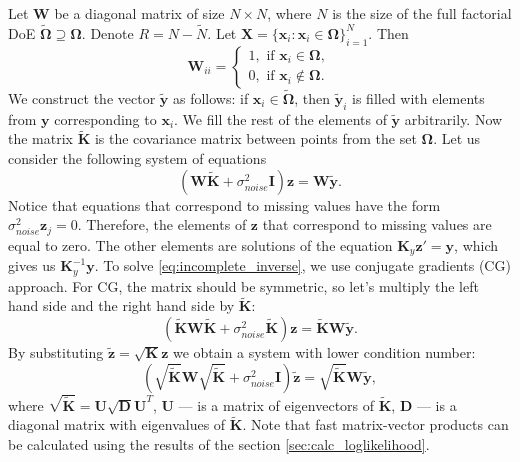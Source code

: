 Let $\mathbf{W}$ be a diagonal matrix of size $N \times N$,
where $N$ is the size of the full factorial DoE
$\boldsymbol{\widetilde{\Omega}} \supseteq \boldsymbol{\Omega}$.
Denote $R = N - \widetilde{N}$.
Let
$\mathbf{X} =
\{\mathbf{x}_i: \mathbf{x}_i \in \boldsymbol{\Omega}\}_{i = 1}^{N}$.
Then
\begin{equation*}
\mathbf{W}_{ii} =
\begin{cases}
    1, \mbox{ if } \mathbf{x}_i \in \boldsymbol{\Omega}, \\
    0, \mbox{ if } \mathbf{x}_i \notin \boldsymbol{\Omega}.
\end{cases}
\end{equation*}
We construct the vector $\mathbf{\widetilde{y}}$ as follows:
if $\mathbf{x}_i \in \boldsymbol{\widetilde{\Omega}}$,
then $\mathbf{\widetilde{y}}_i$ is filled with elements from $\mathbf{y}$
corresponding to $\mathbf{x}_i$.
We fill the rest of the elements of $\mathbf{\widetilde{y}}$ arbitrarily.
Now the matrix $\mathbf{\widetilde{K}}$ is the covariance matrix between points from
the set $\boldsymbol{\Omega}$.
Let us consider the following system of equations
\begin{equation}
\label{eq:incomplete_inverse}
\left (\mathbf{W \widetilde{K}} + \sigma^2_{noise}\mathbf{I} \right )\mathbf{z} =
\mathbf{W\widetilde{y}}.
\end{equation}
Notice that equations that correspond to missing values
have the form $\sigma_{noise}^2 \mathbf{z}_j = 0$.
Therefore, the elements of $\mathbf{z}$ that correspond to missing values are equal to zero.
The other elements are solutions of the equation $\mathbf{K}_y \mathbf{z}' = \mathbf{y}$,
which gives us $\mathbf{K}_y^{-1}\mathbf{y}$.
To solve \eqref{eq:incomplete_inverse}, we use conjugate gradients (CG) approach.
For CG, the matrix should be symmetric, so let's multiply the left hand side and the right hand
side by
$\mathbf{\widetilde{K}}$:
\[
\left (\mathbf{\widetilde{K} W \widetilde{K}} + \sigma^2_{noise}\mathbf{\widetilde{K}} \right) \mathbf{z} =
\mathbf{\widetilde{K}}\mathbf{W\widetilde{y}}.
\]
By substituting $\mathbf{\widetilde{z}} = \mathbf{\sqrt{K} z}$ we obtain
a system with lower condition number:
\[
\left (\mathbf{\sqrt{\widetilde{K}} W \sqrt{\widetilde{K}}} + \sigma^2_{noise} \mathbf{I} \right )\mathbf{\widetilde{z}} =
\mathbf{\sqrt{\widetilde{K}} W \widetilde{y}},
\]
where $\mathbf{\sqrt{\widetilde{K}}} = \mathbf{U \sqrt{D} U}^T$, $\mathbf{U}$ --- is a
matrix of eigenvectors of
$\mathbf{\widetilde{K}}$,
$\mathbf{D}$ --- is a diagonal matrix with eigenvalues of $\mathbf{\widetilde{K}}$.
Note that fast matrix-vector products can be calculated using the results of
the section \ref{sec:calc_loglikelihood}.

